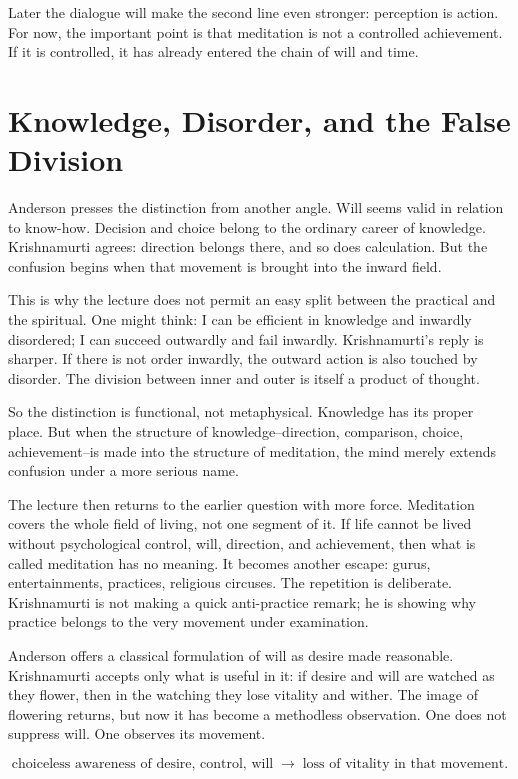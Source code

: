 Later the dialogue will make the second line even stronger: perception is action. For now, the important point is that meditation is not a controlled achievement. If it is controlled, it has already entered the chain of will and time.

\section{Knowledge, Disorder, and the False Division}

Anderson presses the distinction from another angle. Will seems valid in relation to know-how. Decision and choice belong to the ordinary career of knowledge. Krishnamurti agrees: direction belongs there, and so does calculation. But the confusion begins when that movement is brought into the inward field.

This is why the lecture does not permit an easy split between the practical and the spiritual. One might think: I can be efficient in knowledge and inwardly disordered; I can succeed outwardly and fail inwardly. Krishnamurti's reply is sharper. If there is not order inwardly, the outward action is also touched by disorder. The division between inner and outer is itself a product of thought.

So the distinction is functional, not metaphysical. Knowledge has its proper place. But when the structure of knowledge--direction, comparison, choice, achievement--is made into the structure of meditation, the mind merely extends confusion under a more serious name.

The lecture then returns to the earlier question with more force. Meditation covers the whole field of living, not one segment of it. If life cannot be lived without psychological control, will, direction, and achievement, then what is called meditation has no meaning. It becomes another escape: gurus, entertainments, practices, religious circuses. The repetition is deliberate. Krishnamurti is not making a quick anti-practice remark; he is showing why practice belongs to the very movement under examination.

Anderson offers a classical formulation of will as desire made reasonable. Krishnamurti accepts only what is useful in it: if desire and will are watched as they flower, then in the watching they lose vitality and wither. The image of flowering returns, but now it has become a methodless observation. One does not suppress will. One observes its movement.

\begin{equation}
\text{choiceless awareness of desire, control, will}
\;\longrightarrow\;
\text{loss of vitality in that movement}.
\end{equation}

